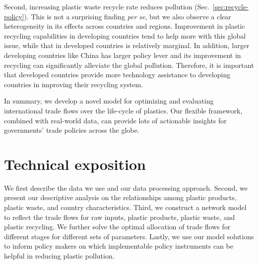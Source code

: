 \documentclass[dvipsnames]{article}
\begin{document}
Second, increasing plastic waste recycle rate reduces pollution (Sec.~\ref{sec:recycle-policy}). This is not a surprising finding \textit{per se}, but we also observe a clear heterogeneity in its effects across countries and regions. Improvement in plastic recycling capabilities in developing countries tend to help more with this global issue, while that in developed countries is relatively marginal. In addition, larger developing countries like China has larger policy lever and its improvement in recycling can significantly alleviate the global pollution. Therefore, it is important that developed countries provide more technology assistance to developing countries in improving their recycling system.

In summary, we develop a novel model for optimizing and evaluating international trade flows over the life-cycle of plastics. Our flexible framework, combined with real-world data, can provide lots of actionable insights for governments' trade policies across the globe.

\pagebreak


\section{Technical exposition}

We first describe the data we use and our data processing approach. Second, we present our descriptive analysis on the relationships among plastic products, plastic waste, and country characteristics. Third, we construct a network model to reflect the trade flows for raw inputs, plastic products, plastic waste, and plastic recycling. We further solve the optimal allocation of trade flows for different stages for different sets of parameters. Lastly, we use our model solutions to inform policy makers on which implementable policy instruments can be helpful in reducing plastic pollution.
\end{document}
